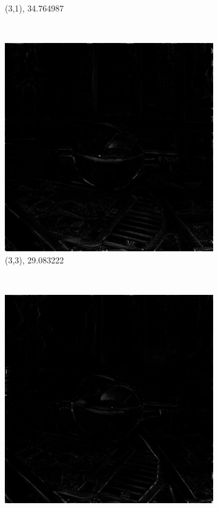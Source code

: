 \documentclass[11pt,a4paper,titlepage]{article}
\begin{document}
\begin{figure}
\begin{subfigure}[t]{0.3\textwidth}
		\caption{(3,1), 34.764987}
	\end{subfigure}%
	~
	\begin{subfigure}[t]{0.3\textwidth}
		\includegraphics[width=\textwidth]{results/tile_blending/tarot6x6x512x512-512x512x5-sampling=2x_tileRes=200x200_overlap=0.5/MSE_for_view_(3,3).png}
		\caption{(3,3), 29.083222}
	\end{subfigure}%
	~
	\begin{subfigure}[t]{0.3\textwidth}
		\includegraphics[width=\textwidth]{results/tile_blending/tarot6x6x512x512-512x512x5-sampling=2x_tileRes=200x200_overlap=0.5/MSE_for_view_(3,6).png} 

\end{subfigure}
\end{figure}
\end{document}
